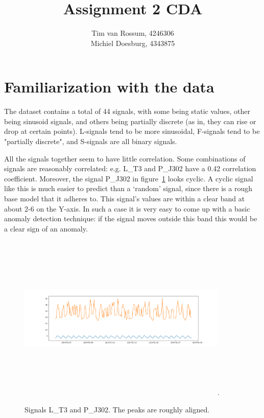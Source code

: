 \documentclass[]{article}
\title{Assignment 2 CDA}
\author{Tim van Rossum, 4246306\\
	Michiel Doesburg, 4343875}
\begin{document}
\maketitle
\section{Familiarization with the data}
The dataset contains a total of 44 signals, with some being static values, other being sinusoid signals, and others being partially discrete (as in, they can rise or drop at certain points). L-signals tend to be more sinusoidal, F-signals tend to be "partially discrete", and S-signals are all binary signals.

All the signals together seem to have little correlation. Some combinations of signals are reasonably correlated: e.g. L\_T3 and P\_J302 have a 0.42 correlation coefficient. Moreover, the signal P\_J302 in figure~\ref{correlation} looks cyclic. A cyclic signal like this is much easier to predict than a `random' signal, since there is a rough base model that it adheres to. This signal's values are within a clear band at about 2-6 on the Y-axis. In such a case it is very easy to come up with a basic anomaly detection technique: if the signal moves outside this band this would be a clear sign of an anomaly. 

\begin{figure}

\includegraphics[width=10cm,height=8cm]{./visuallizations/correlated_signals.png}.
\label{correlation}
\caption{Signals L\_T3 and P\_J302. The peaks are roughly aligned.}
\end{figure}
\end{document}
